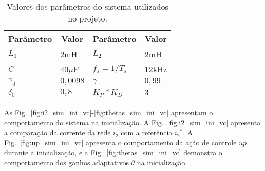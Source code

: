   \begin{table}[htb]
    \renewcommand{\arraystretch}{1.35}
    \setlength{\tabcolsep}{1.2mm}
    \caption{Valores dos parâmetros do sistema utilizados no projeto.}
    \label{tab:parametros_projeto_vc}
    \centering
    \begin{tabular}{l l l l}
      \hline
      \multicolumn{1}{c}{Parâmetro} & \multicolumn{1}{c}{Valor} &
      \multicolumn{1}{c}{Parâmetro} & \multicolumn{1}{c}{Valor} \\
      \hline
      $L_1$      & $2$mH    & $L_2$         & $2$mH   \\
      $C$        & $40\mu$F & $f_s = 1/T_s$ & $12$kHz \\
      $\gamma_d$ & $0,0098$ & $\gamma$      & $0,99$  \\
      $\delta_0$ & $0,8$    & $K_P*K_D$     & $3$     \\
      \hline
    \end{tabular}
  \end{table}

  As Fig.~\ref{fig:i2_sim_ini_vc}-\ref{fig:thetas_sim_ini_vc} apresentam o comportamento do sistema na inicialização. A Fig.~\ref{fig:i2_sim_ini_vc} apresenta a comparação da corrente da rede $i_2$ com a referência ${i_2}^*$. A Fig.~\ref{fig:up_sim_ini_vc} apresenta o comportamento da ação de controle $up$ durante a inicialização, e a Fig.~\ref{fig:thetas_sim_ini_vc} demonstra o comportamento dos ganhos adaptativos $\theta$ na inicialização.

  \noindent
  \begin{minipage}{\textwidth}
    \makebox[\textwidth]{
      \centering
      \def\svgwidth{\textwidth}
      }
    \label{fig:i2_sim_ini_vc}
  \end{minipage}

  \noindent
  \begin{minipage}{\textwidth}
    \makebox[\textwidth]{
      \centering
      \def\svgwidth{\textwidth}
      }
    \label{fig:up_sim_ini_vc}
  \end{minipage}

  \noindent
  \begin{minipage}{\textwidth}
    \makebox[\textwidth]{
      \centering
      \def\svgwidth{\textwidth}
      }
    \label{fig:thetas_sim_ini_vc}
  \end{minipage}


